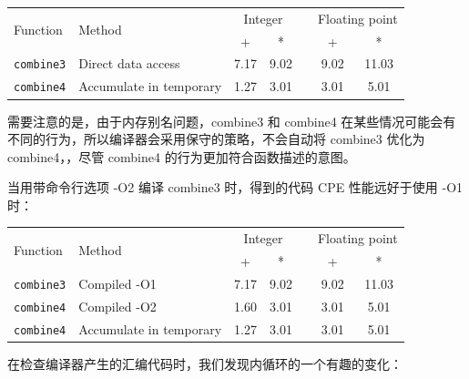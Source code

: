\begin{table}[!ht]
    \centering
    \begin{tabular}{llccccc}
        \toprule
         \multirow{2}{*}{Function} & \multirow{2}{*}{Method} & \multicolumn{2}{c}{Integer} & & \multicolumn{2}{c}{Floating point} \\
         \cmidrule{3-4}
         \cmidrule{6-7}
          & & + & * & & + & * \\
         \midrule
         \texttt{combine3} & Direct data access & 7.17 & 9.02 & & 9.02 & 11.03 \\
         \texttt{combine4} & Accumulate in temporary & 1.27 & 3.01 & & 3.01 & 5.01 \\
         \bottomrule
    \end{tabular}
\end{table}

需要注意的是，由于内存别名问题，combine3 和 combine4 在某些情况可能会有不同的行为，所以编译器会采用保守的策略，不会自动将 combine3 优化为 combine4，，尽管 combine4 的行为更加符合函数描述的意图。

当用带命令行选项 -O2 编译 combine3 时，得到的代码 CPE 性能远好于使用 -O1 时：

\begin{table}[!ht]
    \centering
    \begin{tabular}{llccccc}
        \toprule
         \multirow{2}{*}{Function} & \multirow{2}{*}{Method} & \multicolumn{2}{c}{Integer} & & \multicolumn{2}{c}{Floating point} \\
         \cmidrule{3-4}
         \cmidrule{6-7}
          & & + & * & & + & * \\
         \midrule
         \texttt{combine3} & Compiled -O1 & 7.17 & 9.02 & & 9.02 & 11.03 \\
         \texttt{combine4} & Compiled -O2 & 1.60 & 3.01 & & 3.01 & 5.01 \\
         \texttt{combine4} & Accumulate in temporary & 1.27 & 3.01 & & 3.01 & 5.01 \\
         \bottomrule
    \end{tabular}
\end{table}

在检查编译器产生的汇编代码时，我们发现内循环的一个有趣的变化：


